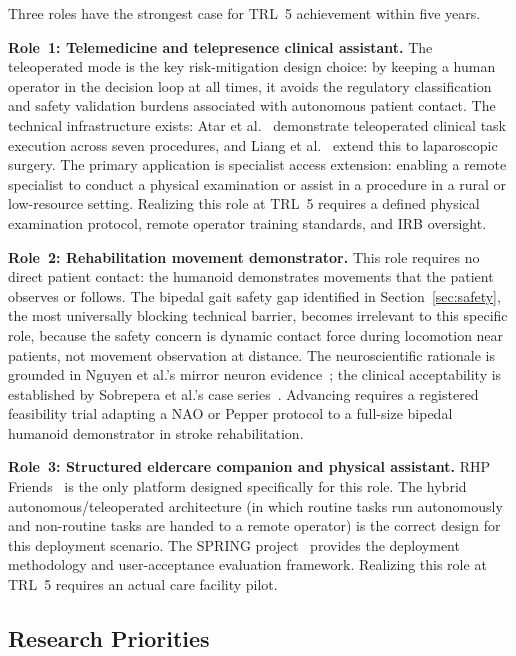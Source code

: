 \documentclass[acmsmall]{acmart}
\begin{document}
Three roles have the strongest case for TRL~5 achievement within five years.

\textbf{Role~1: Telemedicine and telepresence clinical assistant.} The teleoperated
mode is the key risk-mitigation design choice: by keeping a human operator in the
decision loop at all times, it avoids the regulatory classification and safety
validation burdens associated with autonomous patient contact. The technical
infrastructure exists: Atar et al.~\cite{atar2025humanoids} demonstrate
teleoperated clinical task execution across seven procedures, and Liang et
al.~\cite{liang2025lapsurgie} extend this to laparoscopic surgery. The primary
application is specialist access extension: enabling a remote specialist to
conduct a physical examination or assist in a procedure in a rural or low-resource
setting. Realizing this role at TRL~5 requires a defined physical examination
protocol, remote operator training standards, and IRB oversight.

\textbf{Role~2: Rehabilitation movement demonstrator.} This role requires no
direct patient contact: the humanoid demonstrates movements that the patient
observes or follows. The bipedal gait safety gap identified in
Section~\ref{sec:safety}, the most universally blocking technical
barrier, becomes irrelevant to this specific role, because the safety concern is
dynamic contact force during locomotion near patients, not movement observation at
distance. The neuroscientific rationale is grounded in Nguyen et al.'s mirror
neuron evidence~\cite{nguyen2024eeg}; the clinical acceptability is established by
Sobrepera et al.'s case series~\cite{sobrepera2022feasibility}. Advancing requires a registered
feasibility trial adapting a NAO or Pepper protocol to a full-size bipedal
humanoid demonstrator in stroke rehabilitation.

\textbf{Role~3: Structured eldercare companion and physical assistant.} RHP
Friends~\cite{benallegue2025rhp} is the only platform designed specifically for
this role. The hybrid autonomous/teleoperated architecture (in which routine
tasks run autonomously and non-routine tasks are handed to a remote
operator) is the correct design for this deployment scenario. The SPRING
project~\cite{alamedapineda2024spring} provides the deployment methodology and
user-acceptance evaluation framework. Realizing this role at TRL~5 requires an
actual care facility pilot.

\subsection{Research Priorities}
\label{sec:research}
\end{document}
